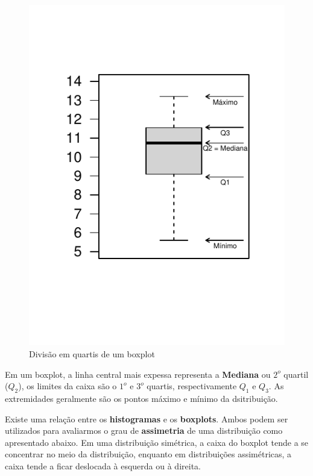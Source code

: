 \documentclass[
]{book}
\begin{document}
\begin{figure}

{\centering \includegraphics{probest-cambientais_files/figure-latex/boxquartis-1} 

}

\caption{Divisão em quartis de um boxplot}\label{fig:boxquartis}
\end{figure}

Em um boxplot, a linha central mais expessa representa a \textbf{Mediana} ou \(2^o\) quartil (\(Q_2\)), os limites da caixa são o \(1^o\) e \(3^o\) quartis, respectivamente \(Q_1\) e \(Q_3\). As extremidades geralmente são os pontos máximo e mínimo da dsitribuição.

Existe uma relação entre os \textbf{histogramas} e os \textbf{boxplots}. Ambos podem ser utilizados para avaliarmos o grau de \textbf{assimetria} de uma distribuição como apresentado abaixo. Em uma distribuição simétrica, a caixa do boxplot tende a se concentrar no meio da distribuição, enquanto em distribuições assimétricas, a caixa tende a ficar deslocada à esquerda ou à direita.
\end{document}
